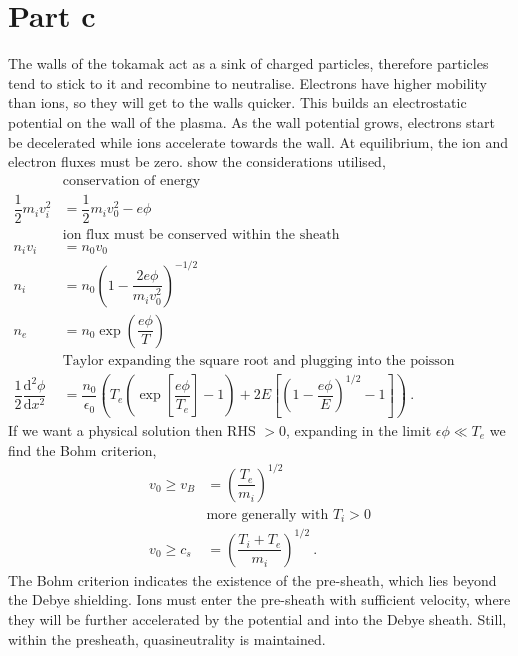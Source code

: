 \documentclass[10pt,a4paper]{article}
\begin{document}
	\section{Part c}
	The walls of the tokamak act as a sink of charged particles, therefore particles tend to stick to it and recombine to neutralise. Electrons have higher mobility than ions, so they will get to the walls quicker. This builds an electrostatic potential on the wall of the plasma. As the wall potential grows, electrons start be decelerated while ions accelerate towards the wall. At equilibrium, the ion and electron fluxes must be zero.  show the considerations utilised,
	\begin{subequations}
		\begin{align}
		&\textrm{conservation of energy}\nonumber\\
		\dfrac{1}{2} m_i v_i^2 &= \dfrac{1}{2} m_i v_0^2 - e \phi\\
		&\textrm{ion flux must be conserved within the sheath}\nonumber\\
		n_iv_i &= n_0 v_0 \\
		n_i &= n_0 \left(1 - \dfrac{2e\phi}{m_i v_0^2}\right)^{-1/2}\\
		n_e &= n_0 \exp\left(\dfrac{e\phi}{T}\right) \\
		&\textrm{Taylor expanding the square root and plugging into the poisson equation}\nonumber\\
		\dfrac{1}{2} \dfrac{\mathrm{d}^2 \phi}{\mathrm{d}x^2} &= \dfrac{n_0}{\epsilon_0} \left(T_e \left(\exp\left[\dfrac{e\phi}{T_e}\right] - 1\right) + 2E \left[\left(1-\dfrac{e\phi}{E}\right)^{1/2} - 1\right]\right)~.
		\end{align}\label{e:sheath}
	\end{subequations}
	If we want a physical solution then RHS $> 0$, expanding in the limit $\epsilon \phi \ll T_e$ we find the Bohm criterion,
	\begin{subequations}
		\begin{align}
			v_0 \geq v_B &= \left(\dfrac{T_e}{m_i}\right)^{1/2} \\
			&\textrm{more generally with $T_i > 0$}\nonumber\\
			v_0 \geq c_s &=\left(\dfrac{T_i + T_e}{m_i}\right)^{1/2}~.
		\end{align}
	\end{subequations}
	The Bohm criterion indicates the existence of the pre-sheath, which lies beyond the Debye shielding. Ions must enter the pre-sheath with sufficient velocity, where they will be further accelerated by the potential and into the Debye sheath. Still, within the presheath, quasineutrality is maintained.
	
\end{document}
